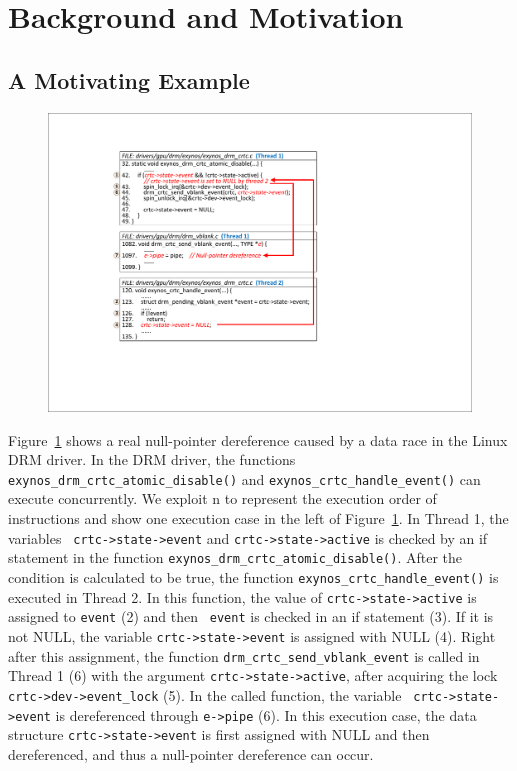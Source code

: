 \section{Background and Motivation}
\label{sec_motivation}

\subsection{A Motivating Example}
\label{subsec_motivating_example}

\begin{figure}[htbp]
	\centering
	\includegraphics[width=1\linewidth]{figures/fig_demo_bug.pdf}
	\label{fig_demo_bug}
\end{figure}
Figure~\ref{fig_demo_bug} shows a real null-pointer dereference caused by a 
data race in the Linux DRM driver. In the DRM driver, the functions {\tt 
exynos\_drm\_crtc\_atomic\_disable()} and {\tt exynos\_crtc\_handle\_event()} 
can execute concurrently. We exploit \textcircled{\footnotesize{n}} to 
represent the execution order of instructions and show one execution case in 
the left of Figure~\ref{fig_demo_bug}. In Thread 1, the variables {\tt 
crtc->state->event} and {\tt crtc->state->active} is checked by an if statement 
in the function {\tt exynos\_drm\_crtc\_atomic\_disable()}. After the condition 
is calculated to be true, the function {\tt exynos\_crtc\_handle\_event()} is 
executed in Thread 2. In this function, the value of {\tt crtc->state->active} 
is assigned to {\tt event} (\textcircled{\footnotesize{2}}) and then {\tt 
event} is checked in an if statement (\textcircled{\footnotesize{3}}). If it is 
not NULL, the variable {\tt crtc->state->event} is assigned with NULL 
(\textcircled{\footnotesize{4}}). Right after this assignment, the function 
{\tt drm\_crtc\_send\_vblank\_event} is called  in Thread 1 
(\textcircled{\footnotesize{6}}) with the argument {\tt crtc->state->active}, 
after acquiring the lock {\tt crtc->dev->event\_lock} 
(\textcircled{\footnotesize{5}}). In the called function, the variable {\tt 
crtc->state->event} is dereferenced through {\tt e->pipe} 
(\textcircled{\footnotesize{6}}). In this execution case, the data structure 
{\tt crtc->state->event} is first assigned with NULL and then dereferenced, and 
thus a null-pointer dereference can occur.

